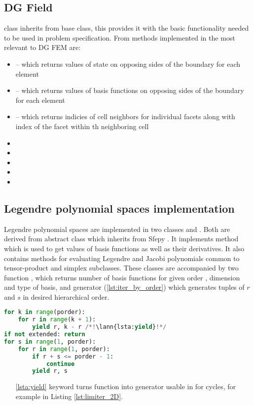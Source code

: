 \subsection{DG Field}
 class inherits from  base class, this provides it with the basic functionality needed
to be used in problem specification. From methods implemented in  the most relevant to DG FEM are:
\begin{itemize}
	\item {} -- which returns values of state on 
	opposing sides of the boundary for each element
	\item {} -- which returns values of basis functions 
	on opposing sides of the boundary for each element
	\item {} -- which returns indicies of cell neighbors 
	for individual facets along with index of the facet within th neighboring cell 
	\item {}
	\item {}
	\item {}
	\item {}
	\item {}
\end{itemize}

\subsection{Legendre polynomial spaces implementation}
Legendre polynomial spaces are implemented in two classes 
 and 
. Both are derived from abstract class 
 which inherits from Sfepy 
. It implements method  which is used to 
get values of basis functions as well as their derivatives. It also contains 
methods for evaluating Legendre and Jacobi polynomials common to tensor-product 
and simplex subclasses. These classes are accompanied by two function , which returns number of basis functions for given order , dimension and type of basis, and generator  (\ref{lst:iter_by_order}) which generates tuples of $r$ and $s$ in desired hierarchical order.
\setcounter{lstannotation}{0}
\begin{lstlisting}[language=Python, caption= Itaration over $r$ and $s$ indicies of basis functions \label{lst:iter_by_order}]
for k in range(porder):
	for r in range(k + 1):
		yield r, k - r /*!\lann{lsta:yield}!*/
if not extended: return
for s in range(1, porder):
	for r in range(1, porder):
		if r + s <= porder - 1:
			continue
		yield r, s
\end{lstlisting}
\begin{itemize}
	\item[\ref{lsta:yield}]  keyword turns function into generator usable 
	in for cycles, for example in Listing \ref{lst:limiter_2D}.
\end{itemize}


